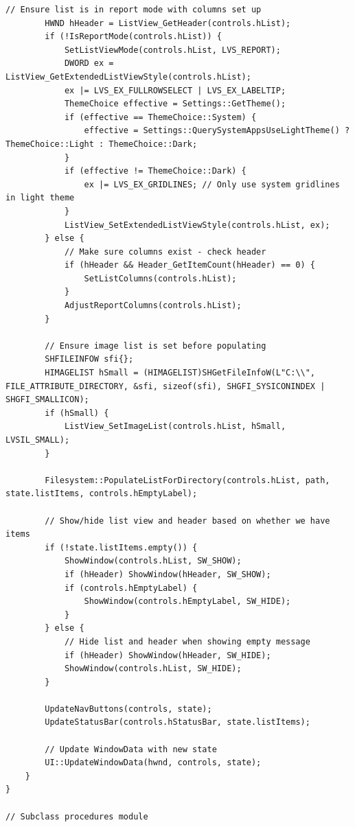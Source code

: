 \begin{lstlisting}[style=CodeListing]
        // Ensure list is in report mode with columns set up
        HWND hHeader = ListView_GetHeader(controls.hList);
        if (!IsReportMode(controls.hList)) {
            SetListViewMode(controls.hList, LVS_REPORT);
            DWORD ex = ListView_GetExtendedListViewStyle(controls.hList);
            ex |= LVS_EX_FULLROWSELECT | LVS_EX_LABELTIP;
            ThemeChoice effective = Settings::GetTheme();
            if (effective == ThemeChoice::System) {
                effective = Settings::QuerySystemAppsUseLightTheme() ? ThemeChoice::Light : ThemeChoice::Dark;
            }
            if (effective != ThemeChoice::Dark) {
                ex |= LVS_EX_GRIDLINES; // Only use system gridlines in light theme
            }
            ListView_SetExtendedListViewStyle(controls.hList, ex);
        } else {
            // Make sure columns exist - check header
            if (hHeader && Header_GetItemCount(hHeader) == 0) {
                SetListColumns(controls.hList);
            }
            AdjustReportColumns(controls.hList);
        }
        
        // Ensure image list is set before populating
        SHFILEINFOW sfi{};
        HIMAGELIST hSmall = (HIMAGELIST)SHGetFileInfoW(L"C:\\", FILE_ATTRIBUTE_DIRECTORY, &sfi, sizeof(sfi), SHGFI_SYSICONINDEX | SHGFI_SMALLICON);
        if (hSmall) {
            ListView_SetImageList(controls.hList, hSmall, LVSIL_SMALL);
        }
        
        Filesystem::PopulateListForDirectory(controls.hList, path, state.listItems, controls.hEmptyLabel);
        
        // Show/hide list view and header based on whether we have items
        if (!state.listItems.empty()) {
            ShowWindow(controls.hList, SW_SHOW);
            if (hHeader) ShowWindow(hHeader, SW_SHOW);
            if (controls.hEmptyLabel) {
                ShowWindow(controls.hEmptyLabel, SW_HIDE);
            }
        } else {
            // Hide list and header when showing empty message
            if (hHeader) ShowWindow(hHeader, SW_HIDE);
            ShowWindow(controls.hList, SW_HIDE);
        }
        
        UpdateNavButtons(controls, state);
        UpdateStatusBar(controls.hStatusBar, state.listItems);
        
        // Update WindowData with new state
        UI::UpdateWindowData(hwnd, controls, state);
    }
}

// Subclass procedures module


\end{lstlisting}
